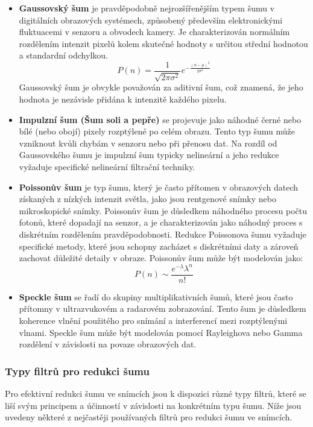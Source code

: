 \documentclass[male,czech,api_ing]{thesis}
\begin{document}
\begin{itemize}
    \item \textbf{Gaussovský šum} je pravděpodobně nejrozšířenějším typem šumu v digitálních obrazových systémech, způsobený především elektronickými fluktuacemi v senzoru a obvodech kamery. Je charakterizován normálním rozdělením intenzit pixelů kolem skutečné hodnoty s určitou střední hodnotou a standardní odchylkou. \[P(n) = \frac{1}{\sqrt{2\pi\sigma^2}} e^{-\frac{(n-\mu)^2}{2\sigma^2}}\] Gaussovský šum je obvykle považován za aditivní šum, což znamená, že jeho hodnota je nezávisle přidána k intenzitě každého pixelu. \cite{ImageDenoisingTechniques}
    \item \textbf{Impulzní šum (Šum soli a pepře)} se projevuje jako náhodné černé nebo bílé (nebo obojí) pixely rozptýlené po celém obrazu. Tento typ šumu může vzniknout kvůli chybám v senzoru nebo při přenosu dat. Na rozdíl od Gaussovského šumu je impulzní šum typicky nelineární a jeho redukce vyžaduje specifické nelineární filtrační techniky. \cite{ImageDenoisingTechniques}
    \item \textbf{Poissonův šum} je typ šumu, který je často přítomen v obrazových datech získaných z nízkých intenzit světla, jako jsou rentgenové snímky nebo mikroskopické snímky. Poissonův šum je důsledkem náhodného procesu počtu fotonů, které dopadají na senzor, a je charakterizován jako náhodný proces s diskrétním rozdělením pravděpodobnosti. Redukce Poissonova šumu vyžaduje specifické metody, které jsou schopny zacházet s diskrétními daty a zároveň zachovat důležité detaily v obraze. \cite{ImageDenoisingTechniques} Poissonův šum může být modelován jako: \[ P(n) \sim \frac{e^{-\lambda} \lambda^n}{n!}\] 
    \item \textbf{Speckle šum} se řadí do skupiny multiplikativních šumů, které jsou často přítomny v ultrazvukovém a radarovém zobrazování. Tento šum je důsledkem koherence vlnění použitého pro snímání a interferencí mezi rozptýlenými vlnami. Speckle šum může být modelován pomocí Rayleighova nebo Gamma rozdělení v závislosti na povaze obrazových dat. \cite{ImageDenoisingTechniques}
\end{itemize}

\subsubsection{Typy filtrů pro redukci šumu}
Pro efektivní redukci šumu ve snímcích jsou k dispozici různé typy filtrů, které se liší svým principem a účinností v závislosti na konkrétním typu šumu. Níže jsou uvedeny některé z nejčastěji používaných filtrů pro redukci šumu ve snímcích.
\end{document}
